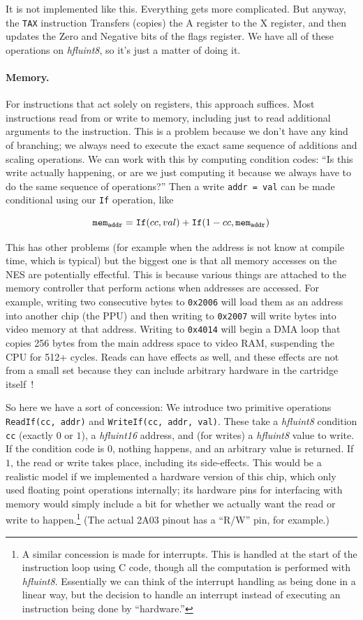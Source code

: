 \documentclass[twocolumn]{article}
\begin{document}
It is not implemented like this. Everything gets more complicated. But anyway,
the {\tt TAX} instruction Transfers (copies) the A register to the X register,
and then updates the Zero and Negative bits of the flags register. We have all
of these operations on {\it hfluint8}, so it's just a matter of doing it.

\paragraph{Memory.}
For instructions that act solely on registers, this approach suffices.
Most instructions read from or write to memory, including just to read
additional arguments to the instruction. This is a problem because we
don't have any kind of branching; we always need to execute the exact
same sequence of additions and scaling operations. We can work with
this by computing condition codes: ``Is this write actually happening,
or are we just computing it because we always have to do the same
sequence of operations?'' Then a write {\tt addr = val} can be made
conditional using our {\tt If} operation, like

$${\tt mem}_{\tt addr} = {\tt If}(cc, val) + {\tt If}(1 - cc, {\tt mem}_{\tt addr})$$

This has other problems (for example when the address is not know at
compile time, which is typical) but the biggest one is that all memory
accesses on the NES are potentially effectful. This is because various
things are attached to the memory controller that perform actions when
addresses are accessed. For example, writing two consecutive bytes to
{\tt 0x2006} will load them as an address into another chip (the PPU)
and then writing to {\tt 0x2007} will write bytes into video memory at
that address. Writing to {\tt 0x4014} will begin a DMA loop that copies
256 bytes from the main address space to video RAM, suspending the CPU for
512+ cycles. Reads can have effects as well, and these effects are not
from a small set because they can include arbitrary hardware in the
cartridge itself~\cite{murphy2018reverse}!

So here we have a sort of concession: We introduce two primitive operations
\verb+ReadIf(cc, addr)+ and \verb+WriteIf(cc, addr, val)+. These take
a {\it hfluint8} condition {\tt cc} (exactly $0$ or $1$), a {\it hfluint16}
address, and (for writes) a {\it hfluint8} value to write. If the condition
code is $0$, nothing happens, and an arbitrary value is returned. If $1$,
the read or write takes place, including its side-effects. This would
be a realistic model if we implemented a hardware version of this chip,
which only used floating point operations internally; its hardware pins
for interfacing with memory would simply include a bit for whether we
actually want the read or write to happen.\!\footnote{
  A similar concession is made for interrupts. This is handled at the start of
  the instruction loop using C code, though all the computation is performed
  with {\it hfluint8}. Essentially we can think of the interrupt handling
  as being done in a linear way, but the decision to handle an interrupt
  instead of executing an instruction being done by ``hardware.''}
(The actual 2A03 pinout has a ``R/W'' pin, for example.)
\end{document}
